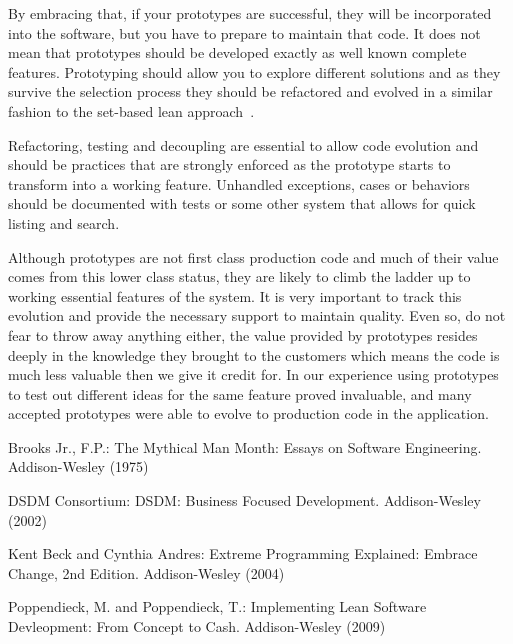 \documentclass[lnbip]{svmultln}
\begin{document}
By embracing that, if your prototypes are successful, they will be
incorporated into the software, but you have to prepare to maintain that
code. It does not mean that prototypes should be developed exactly
as well known complete features. Prototyping should allow you to
explore different solutions and as they survive
the selection process they should be refactored and evolved in a similar fashion to the set-based lean approach~\cite{Poppendieck2009}.

Refactoring, testing and decoupling are essential to allow code
evolution and should be practices that are strongly enforced as the prototype 
starts to transform into a working feature. 
Unhandled exceptions, cases or behaviors should be
documented with tests or some other system that allows for
quick listing and search.

Although prototypes are not first class production code and much of
their value comes from this lower class status, they are likely to
climb the ladder up to working essential features of the system. It
is very important to track this evolution and provide the necessary support
to maintain quality. Even so, do not fear to throw away anything either,
the value provided by prototypes resides deeply in the knowledge they
brought to the customers which means the code is much less valuable
then we give it credit for. In our experience using prototypes to test out different ideas for the same feature proved invaluable, and many accepted prototypes were able to evolve to production code in the application.

%
%
\begin{thebibliography}{5}

 Brooks Jr., F.P.: The Mythical Man Month: Essays
  on Software Engineering. Addison-Wesley (1975)

 DSDM Consortium: DSDM: Business Focused
  Development. Addison-Wesley (2002)
  
 Kent Beck and Cynthia Andres: Extreme Programming Explained: Embrace Change, 2nd Edition. Addison-Wesley (2004)  




 Poppendieck, M. and Poppendieck, T.:
  Implementing Lean Software Devleopment: From Concept to
  Cash. Addison-Wesley (2009)

\end{thebibliography}
%
\end{document}

